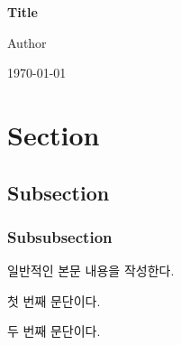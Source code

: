 \documentclass[a4paper,11pt]{article}
\begin{document}

\begin{titlepage}
    \centering
    \vspace*{\fill}

    {\Huge\bfseries Title\par}

    \vspace{1cm}

    {\Large Author\par}

    \vspace{0.5cm}

    {\large \today\par}

    \vspace*{\fill}
\end{titlepage}



\section{Section}

\subsection{Subsection}

\subsubsection{Subsubsection}

일반적인 본문 내용을 작성한다.



첫 번째 문단이다.

\dhknp

두 번째 문단이다.


\end{document}
